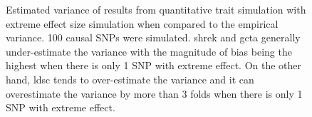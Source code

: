 \begin{figure}
{				
				\label{fig:ldscInQtEx100cVarCom}
			}
			\caption[Estimation of Variance in Extreme Effect Size Simulation]
			{Estimated variance of results from quantitative trait simulation with extreme effect size simulation when compared to the empirical variance.
				100 causal \glspl{SNP} were simulated.
				\gls{shrek} and \gls{gcta} generally under-estimate the variance with the magnitude of bias being the highest when there is only 1 \gls{SNP} with extreme effect.
				On the other hand, \gls{ldsc} tends to over-estimate the variance and it can overestimate the variance by more than 3 folds when there is only 1 \gls{SNP} with extreme effect.
			} 
			\label{fig:QtEx100cVarCom}
		\end{figure}